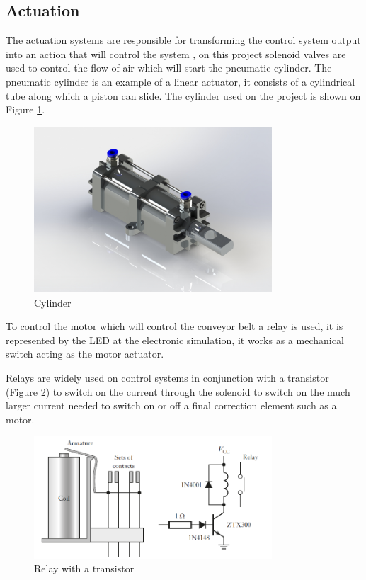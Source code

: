\documentclass[transmag]{IEEEtran}
\begin{document}
\subsection{Actuation}

The actuation systems are responsible for transforming the control system output into an action that will control the system \cite{ref2}, on this project solenoid valves are used to control the flow of air which will start the pneumatic cylinder. 
The pneumatic cylinder is an example of a linear actuator, it consists of a cylindrical tube along which a piston can slide. The cylinder used on the project is shown on Figure \ref{Cylinder}.

\begin{figure}[h]
\centerline{\includegraphics[width=3.5in]{./images/Cylinder}}
\caption{Cylinder \cite{ref2}\label{Cylinder}}
\end{figure}


To control the motor which will control the conveyor belt a relay is used, it is  represented by the LED at the electronic simulation, it works as a mechanical switch acting as the motor actuator.

Relays are widely used on control systems in conjunction with a transistor (Figure \ref{Relay}) to switch on the current through the solenoid to switch on the much larger current needed to switch on or off a final correction element such as a motor.\cite{ref2}

\begin{figure}[h]
\centerline{\includegraphics[width=3.5in]{./images/Relay}}
\caption{Relay with a transistor \cite{ref2}\label{Relay}}
\end{figure}
\end{document}
